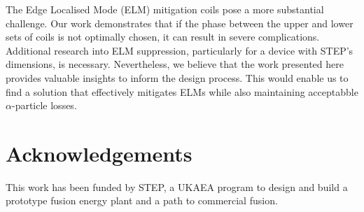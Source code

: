 \documentclass[10pt, a4paper, twoside]{article}
\begin{document}
The Edge Localised Mode (ELM) mitigation coils pose a more substantial challenge. Our work demonstrates that if the phase between the upper and lower sets of coils is not optimally chosen, it can result in severe complications. Additional research into ELM suppression, particularly for a device with STEP's dimensions, is necessary. Nevertheless, we believe that the work presented here provides valuable insights to inform the design process. This would enable us to find a solution that effectively mitigates ELMs while also maintaining acceptabble $\alpha$-particle losses.

\section*{Acknowledgements}

This work has been funded by STEP, a UKAEA program to design and build a prototype fusion energy plant and a path to commercial fusion.
\end{document}
